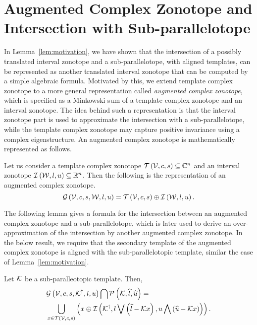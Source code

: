 \section{Augmented Complex Zonotope and Intersection with Sub-parallelotope}
In Lemma~\ref{lem:motivation}, we have shown that the intersection of
a possibly translated interval zonotope and a sub-parallelotope, with
aligned templates, can be represented as another translated interval
zonotope that can be computed by a simple algebraic formula.
Motivated by this, we extend template complex zonotope to a more
general representation called {\it augmented complex zonotope},
which is specified as a Minkowski sum of a template complex zonotope
and an interval zonotope.  The idea behind such a representation is
that the interval zonotope part is used to approximate the
intersection with a sub-parallelotope, while the template complex
zonotope may capture positive invariance using a complex
eigenstructure.  An augmented complex zonotope is
mathematically represented as follows.
%
\begin{definition}
Let us consider a template complex zonotope
$\mathit{\operatorname{\mathcal{T}}}\left(\mathcal{V},c,s\right)\subseteq\mathbb{C}^n$ and an interval
zonotope $\mathit{\operatorname{\mathcal{I}}}\left(\mathcal{W},l,u\right)\subseteq\mathbb{R}^n$.  Then the
following is the representation of an augmented complex zonotope.
%
\[
\mathcal{G}\left(\mathcal{V},c,s,\mathcal{W},l,u\right)=\mathit{\operatorname{\mathcal{T}}}\left(\mathcal{V},c,s\right)\oplus \mathit{\operatorname{\mathcal{I}}}\left(\mathcal{W},l,u\right).
\]
%
\end{definition}
%
The following lemma gives a formula for the intersection between
an augmented complex zonotope and a sub-parallelotope, which is later
used to derive an over-approximation of the intersection by another
augmented complex zonotope.  In the below result, we require that the
secondary template of the augmented complex zonotope is aligned with
the sub-parallelotopic template, similar the case of Lemma~\ref{lem:motivation}.
%
\begin{lemma}
Let $\mathcal{K}$ be a sub-paralleotopic template.  Then,
%
\begin{align*}
&
\mathcal{G}\left(\mathcal{V},c,s,{\mathcal{K}}^\dagger,l,u\right)\bigcap\mathcal{P}\left(\mathcal{K},\widehat{l},\widehat{u}\right)=\\
&
\bigcup_{x\in\mathit{\operatorname{\mathcal{T}}}\left(\mathcal{V},c,s\right)}\left(x\oplus\mathit{\operatorname{\mathcal{I}}}\left({\mathcal{K}}^\dagger,l\bigvee \left(\widehat{l}-\mathcal{K}
  x\right),u\bigwedge \left(\widehat{u}-\mathcal{K} x\right)\right)\right).
\end{align*}
%
\end{lemma}
%
